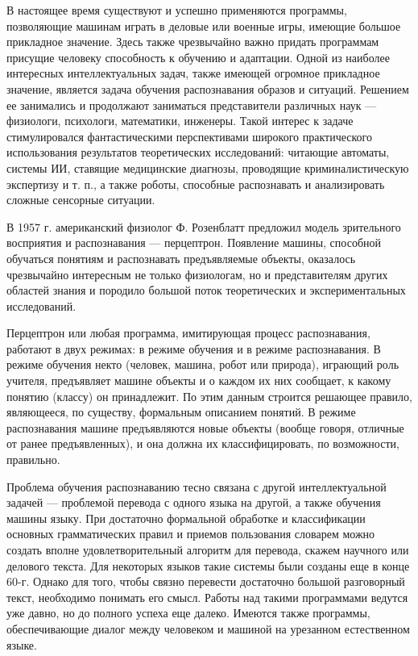 В настоящее время существуют и успешно применяются программы, позволяющие машинам играть в деловые или военные игры, имеющие большое прикладное значение. Здесь также чрезвычайно важно придать программам присущие человеку способность к обучению и адаптации. Одной из наиболее интересных интеллектуальных задач, также имеющей огромное прикладное значение, является задача обучения распознавания образов и ситуаций. Решением ее занимались и продолжают заниматься представители различных наук — физиологи, психологи, математики, инженеры. Такой интерес к задаче стимулировался фантастическими перспективами широкого практического использования результатов теоретических исследований: читающие автоматы, системы ИИ, ставящие медицинские диагнозы, проводящие криминалистическую экспертизу и т. п., а также роботы, способные распознавать и анализировать сложные сенсорные ситуации.

В 1957 г. американский физиолог Ф. Розенблатт предложил модель зрительного восприятия и распознавания — перцептрон. Появление машины, способной обучаться понятиям и распознавать предъявляемые объекты, оказалось чрезвычайно интересным не только физиологам, но и представителям других областей знания и породило большой поток теоретических и экспериментальных исследований.

Перцептрон или любая программа, имитирующая процесс распознавания, работают в двух режимах: в режиме обучения и в режиме распознавания. В режиме обучения некто (человек, машина, робот или природа), играющий роль учителя, предъявляет машине объекты и о каждом их них сообщает, к какому понятию (классу) он принадлежит. По этим данным строится решающее правило, являющееся, по существу, формальным описанием понятий. В режиме распознавания машине предъявляются новые объекты (вообще говоря, отличные от ранее предъявленных), и она должна их классифицировать, по возможности, правильно.

Проблема обучения распознаванию тесно связана с другой интеллектуальной задачей — проблемой перевода с одного языка на другой, а также обучения машины языку. При достаточно формальной обработке и классификации основных грамматических правил и приемов пользования словарем можно создать вполне удовлетворительный алгоритм для перевода, скажем научного или делового текста. Для некоторых языков такие системы были созданы еще в конце 60-г. Однако для того, чтобы связно перевести достаточно большой разговорный текст, необходимо понимать его смысл. Работы над такими программами ведутся уже давно, но до полного успеха еще далеко. Имеются также программы, обеспечивающие диалог между человеком и машиной на урезанном естественном языке.

